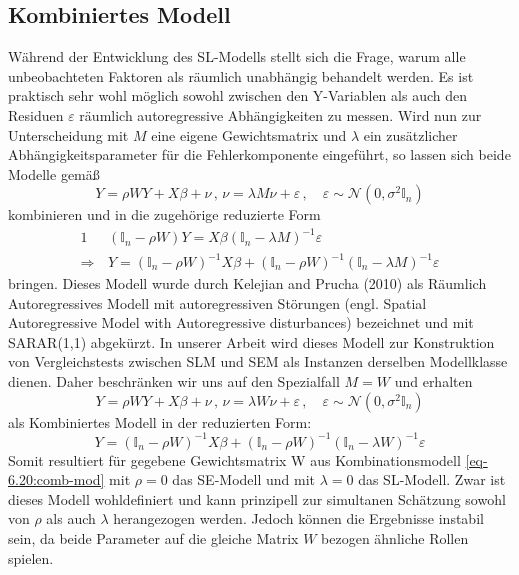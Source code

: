 \subsection{Kombiniertes Modell}
Während der Entwicklung des SL-Modells stellt sich die Frage, warum alle unbeobachteten Faktoren 
als räumlich unabhängig behandelt werden. Es ist praktisch sehr wohl möglich sowohl zwischen den Y-Variablen 
als auch den Residuen $\varepsilon$ räumlich autoregressive Abhängigkeiten zu messen. Wird nun zur Unterscheidung 
mit $M$ eine eigene Gewichtsmatrix und $\lambda$ ein zusätzlicher Abhängigkeitsparameter für die Fehlerkomponente 
eingeführt, so lassen sich beide Modelle gemäß
\begin{equation*}
    Y=\rho W Y + X \beta + \nu \, , \, \nu=\lambda M \nu + \varepsilon \, , \quad 
    \varepsilon \sim \mathcal{N}(0,\sigma^{2} \mathds{I}_{n})
\end{equation*}
kombinieren und in die zugehörige reduzierte Form
\begin{alignat*}{1}
    &(\mathds{I}_{n} - \rho W) Y = X \beta (\mathds{I}_{n} - \lambda M)^{-1} \varepsilon \\
    \Rightarrow \, & Y=(\mathds{I}_{n}-\rho W)^{-1} X \beta + 
    (\mathds{I}_{n}-\rho W)^{-1}(\mathds{I}_{n}-\lambda M)^{-1} \varepsilon
\end{alignat*}
bringen. Dieses Modell wurde durch Kelejian and Prucha (2010) als Räumlich Autoregressives Modell mit 
autoregressiven Störungen
(engl. Spatial Autoregressive Model with Autoregressive disturbances) bezeichnet und mit SARAR(1,1) abgekürzt.
In unserer Arbeit wird dieses Modell zur Konstruktion von Vergleichstests 
zwischen SLM und SEM als Instanzen derselben Modellklasse dienen. Daher beschränken wir uns auf 
den Spezialfall $M=W$ und erhalten
\begin{equation} \label{eq-6.20:comb-mod}
    Y=\rho W Y + X \beta + \nu \, , \, \nu=\lambda W \nu + \varepsilon \, , \quad 
    \varepsilon \sim \mathcal{N}(0,\sigma^{2} \mathds{I}_{n})
\end{equation}
als Kombiniertes Modell in der reduzierten Form: 
\begin{equation*}
    Y=(\mathds{I}_{n}-\rho W)^{-1} X \beta + (\mathds{I}_{n}-\rho W)^{-1}(\mathds{I}_{n}-\lambda W)^{-1} \varepsilon
\end{equation*}
Somit resultiert für gegebene Gewichtsmatrix W aus Kombinationsmodell \eqref{eq-6.20:comb-mod} 
mit $\rho=0$ das SE-Modell und mit $\lambda=0$ das SL-Modell. Zwar ist dieses Modell wohldefiniert und kann 
prinzipell zur simultanen Schätzung sowohl von $\rho$ als auch $\lambda$ herangezogen werden. 
Jedoch können die Ergebnisse instabil sein, da beide Parameter auf die gleiche Matrix $W$ bezogen 
ähnliche Rollen spielen.

